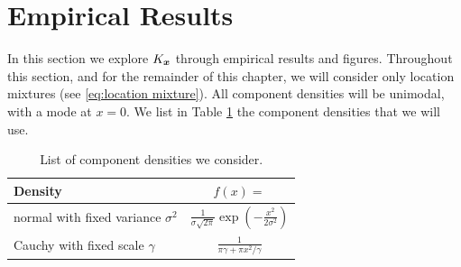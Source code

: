 
	




\section{Empirical Results}
\label{sec:empirical results}
	In this section we explore $K_{\bm{{x}}}$ through empirical results and figures. Throughout this section, and for the remainder of this chapter, we will consider only location mixtures (see \eqref{eq:location mixture}). All component densities will be unimodal, with a mode at $x = 0$. We list in Table \ref{tab:component densities} the component densities that we will use.

	\begin{table}[ht]
	\centering
		\begin{tabular}{l | c}
			Density & $f(x) = $\\
			\hline
			normal with fixed variance $\sigma^2$ & $\frac{1}{\sigma \sqrt{2 \pi}} \exp\left(-\frac{x^2}{2\sigma^2}\right) $\\
			Cauchy with fixed scale $\gamma$ & $\frac{1}{\pi \gamma + \pi x^2/\gamma}$
		\end{tabular}	
		\caption{List of component densities we consider.}
		\label{tab:component densities}
	\end{table}
	

